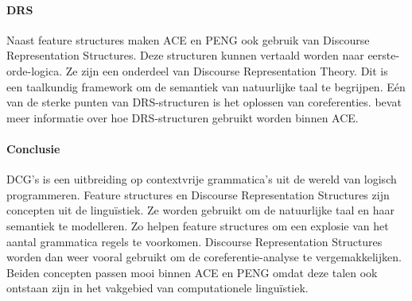 \documentclass[]{article}
\theoremstyle{definition}
\begin{document}
\paragraph{DRS} Naast feature structures maken ACE en PENG ook gebruik van Discourse Representation Structures. Deze structuren kunnen vertaald worden naar eerste-orde-logica. Ze zijn een onderdeel van Discourse Representation Theory. Dit is een taalkundig framework om de semantiek van natuurlijke taal te begrijpen. Eén van de sterke punten van DRS-structuren is het oplossen van coreferenties. \cite{Fuchs2008drs} bevat meer informatie over hoe DRS-structuren gebruikt worden binnen ACE.

\paragraph{Conclusie} DCG's is een uitbreiding op contextvrije grammatica's uit de wereld van logisch programmeren. Feature structures en Discourse Representation Structures zijn concepten uit de linguïstiek. Ze worden gebruikt om de natuurlijke taal en haar semantiek te modelleren. Zo helpen feature structures om een explosie van het aantal grammatica regels te voorkomen. Discourse Representation Structures worden dan weer vooral gebruikt om de coreferentie-analyse te vergemakkelijken. Beiden concepten passen mooi binnen ACE en PENG omdat deze talen ook ontstaan zijn in het vakgebied van computationele linguïstiek.



\end{document}
